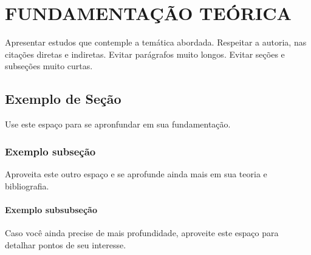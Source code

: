 \chapter{FUNDAMENTAÇÃO TEÓRICA}

Apresentar estudos que contemple a temática abordada. Respeitar a autoria,
nas citações diretas e indiretas. Evitar parágrafos muito longos. Evitar seções e
subseções muito curtas.

\section{Exemplo de Seção}

Use este espaço para se apronfundar em sua fundamentação.

\subsection{Exemplo subseção}

Aproveita este outro espaço e se aprofunde ainda mais em sua teoria e bibliografia.

\subsubsection{Exemplo subsubseção}

Caso você ainda precise de mais profundidade, aproveite este espaço para detalhar pontos de seu interesse.
